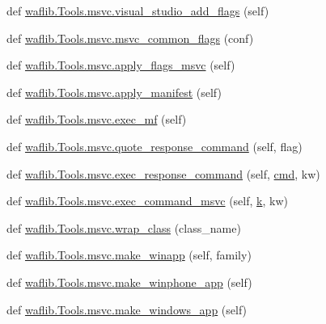 \begin{DoxyCompactItemize}
\item 
def \hyperlink{namespacewaflib_1_1_tools_1_1msvc_a2612f0340f9749fa3aaa1da5a4f758da}{waflib.\+Tools.\+msvc.\+visual\+\_\+studio\+\_\+add\+\_\+flags} (self)
\item 
def \hyperlink{namespacewaflib_1_1_tools_1_1msvc_a061b632c6b5d14ccc16c85a38478a66f}{waflib.\+Tools.\+msvc.\+msvc\+\_\+common\+\_\+flags} (conf)
\item 
def \hyperlink{namespacewaflib_1_1_tools_1_1msvc_afc3769991c03c5bd7ee6cc2750dfb438}{waflib.\+Tools.\+msvc.\+apply\+\_\+flags\+\_\+msvc} (self)
\item 
def \hyperlink{namespacewaflib_1_1_tools_1_1msvc_ab42908ff68ba51a419f4c36751d0535d}{waflib.\+Tools.\+msvc.\+apply\+\_\+manifest} (self)
\item 
def \hyperlink{namespacewaflib_1_1_tools_1_1msvc_a06fd303962ebc6664ef99c2171a4ea49}{waflib.\+Tools.\+msvc.\+exec\+\_\+mf} (self)
\item 
def \hyperlink{namespacewaflib_1_1_tools_1_1msvc_a3accf73dc1db52f81c6f170f2a552718}{waflib.\+Tools.\+msvc.\+quote\+\_\+response\+\_\+command} (self, flag)
\item 
def \hyperlink{namespacewaflib_1_1_tools_1_1msvc_a05f3fa5b6aaec55466b65420441a0649}{waflib.\+Tools.\+msvc.\+exec\+\_\+response\+\_\+command} (self, \hyperlink{sndfile__play_8m_adfc5ba7e22f5e4a6221c12a70503bef3}{cmd}, kw)
\item 
def \hyperlink{namespacewaflib_1_1_tools_1_1msvc_a3be3049317d31cd6bd6f292f58cdc5b5}{waflib.\+Tools.\+msvc.\+exec\+\_\+command\+\_\+msvc} (self, \hyperlink{rfft2d_test_m_l_8m_adc468c70fb574ebd07287b38d0d0676d}{k}, kw)
\item 
def \hyperlink{namespacewaflib_1_1_tools_1_1msvc_a9f4e48294a54177f979fd2859b38f9ab}{waflib.\+Tools.\+msvc.\+wrap\+\_\+class} (class\+\_\+name)
\item 
def \hyperlink{namespacewaflib_1_1_tools_1_1msvc_a742af4128566150a296d3a049856ab87}{waflib.\+Tools.\+msvc.\+make\+\_\+winapp} (self, family)
\item 
def \hyperlink{namespacewaflib_1_1_tools_1_1msvc_a6775cde1a9e529ef8ec67073ab4ac321}{waflib.\+Tools.\+msvc.\+make\+\_\+winphone\+\_\+app} (self)
\item 
def \hyperlink{namespacewaflib_1_1_tools_1_1msvc_aabfc9de92701f46cc9cf6580af3ec7b4}{waflib.\+Tools.\+msvc.\+make\+\_\+windows\+\_\+app} (self)
\end{DoxyCompactItemize}
